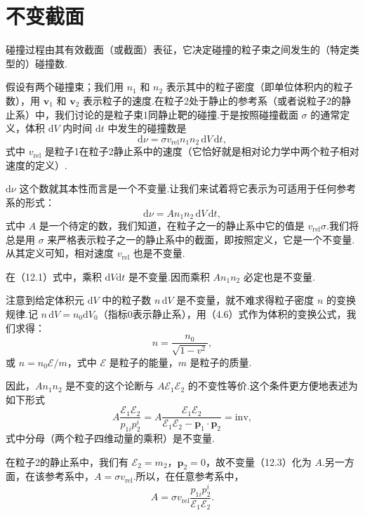 \section{不变截面}

碰撞过程由其有效截面（或截面）表征，它决定碰撞的粒子束之间发生的（特定类型的）碰撞数.

假设有两个碰撞束；我们用 $n_1$ 和 $n_2$ 表示其中的粒子密度（即单位体积内的粒子数），用 $\boldsymbol{v}_1$ 和 $\boldsymbol{v}_2$ 表示粒子的速度.在粒子2处于静止的参考系（或者说粒子2的静止系）中，我们讨论的是粒子束1同静止靶的碰撞.于是按照碰撞截面 $\sigma$ 的通常定义，体积 $\mathrm{d}V$ 内时间 $\mathrm{d}t$ 中发生的碰撞数是
\begin{equation*}
  \mathrm{d}\nu=\sigma v_{\mathrm{rel}}n_1n_2\,\mathrm{d}V\,\mathrm{d}t,
\end{equation*}
式中 $v_{\mathrm{rel}}$ 是粒子1在粒子2静止系中的速度（它恰好就是相对论力学中两个粒子相对速度的定义）.

$\mathrm{d}\nu$ 这个数就其本性而言是一个不变量.让我们来试着将它表示为可适用于任何参考系的形式：
\begin{equation}
  \mathrm{d}\nu=An_1n_2\,\mathrm{d}V\,\mathrm{d}t,
\end{equation}
式中 $A$ 是一个待定的数，我们知道，在粒子之一的静止系中它的值是 $v_{\mathrm{rel}}\sigma$.我们将总是用 $\sigma$ 来严格表示粒子之一的静止系中的截面，即按照定义，它是一个不变量.从其定义可知，相对速度 $v_{\mathrm{rel}}$ 也是不变量.

在（12.1）式中，乘积 $\mathrm{d}V\mathrm{d}t$ 是不变量.因而乘积 $An_1n_2$ 必定也是不变量.

注意到给定体积元 $\mathrm{d}V$ 中的粒子数 $n\,\mathrm{d}V$ 是不变量，就不难求得粒子密度 $n$ 的变换规律.记 $n\,\mathrm{d}V=n_0\mathrm{d}V_0$（指标0表示静止系），用（4.6）式作为体积的变换公式，我们求得：
\begin{equation}
  n=\frac{n_0}{\sqrt{1-v^2}},
\end{equation}
或 $n=n_0\mathcal{E}/m$，式中 $\mathcal{E}$ 是粒子的能量，$m$ 是粒子的质量.

因此，$An_1n_2$ 是不变的这个论断与 $A\mathcal{E}_1\mathcal{E}_2$ 的不变性等价.这个条件更方便地表述为如下形式
\begin{equation}
  A\frac{\mathcal{E}_1\mathcal{E}_2}{p_{1i}p_2^i}
  =A\frac{\mathcal{E}_1\mathcal{E}_2}{\mathcal{E}_1\mathcal{E}_2-\boldsymbol{p}_1\cdot\boldsymbol{p}_2}
  =\mathrm{inv},
\end{equation}
式中分母（两个粒子四维动量的乘积）是不变量.

在粒子2的静止系中，我们有 $\mathcal{E}_2=m_2$，$\boldsymbol{p}_2=0$，故不变量（12.3）化为 $A$.另一方面，在该参考系中，$A=\sigma v_{\mathrm{rel}}$.所以，在任意参考系中，
\begin{equation}
  A=\sigma v_{\mathrm{rel}}\frac{p_{1i}p_2^i}{\mathcal{E}_1\mathcal{E}_2}.
\end{equation}

